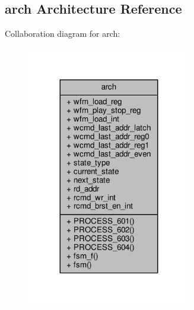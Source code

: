 \subsection{arch Architecture Reference}
\label{classwfm__rcmd__fsm_1_1arch}


Collaboration diagram for arch\+:\nopagebreak
\begin{figure}[H]
\begin{center}
\leavevmode
\includegraphics[width=203pt]{d1/dcd/classwfm__rcmd__fsm_1_1arch__coll__graph}
\end{center}
\end{figure}
